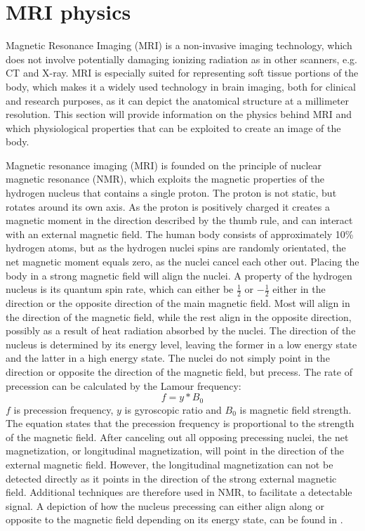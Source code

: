 \section{MRI physics} \label{sec:physics}

Magnetic Resonance Imaging (MRI) is a non-invasive imaging technology, which does not involve potentially damaging ionizing radiation as in other scanners, e.g. CT and X-ray. MRI is especially suited for representing soft tissue portions of the body, which makes it a widely used technology in brain imaging, both for clinical and research purposes, as it can depict the anatomical structure at a millimeter resolution. This section will provide information on the physics behind MRI and which physiological properties that can be exploited to create an image of the body.
 
Magnetic resonance imaging (MRI) is founded on the principle of nuclear magnetic resonance (NMR), which exploits the magnetic properties of the hydrogen nucleus that contains a single proton. The proton is not static, but rotates around its own axis. As the proton is positively charged it creates a magnetic moment in the direction described by the thumb rule, and can interact with an external magnetic field. The human body consists of approximately 10\% hydrogen atoms, but as the hydrogen nuclei spins are randomly orientated, the net magnetic moment equals zero, as the nuclei cancel each other out. Placing the body in a strong magnetic field will align the nuclei. A property of the hydrogen nucleus is its quantum spin rate, which can either be $ \frac{1}{2}$ or $- \frac{1}{2}$ either in the direction or the opposite direction of the main magnetic field. Most will align in the direction of the magnetic field, while the rest align in the opposite direction, possibly as a result of heat radiation absorbed by the nuclei. The direction of the nucleus is determined by its energy level, leaving the former in a low energy state and the latter in a high energy state. The nuclei do not simply point in the direction or opposite the direction of the magnetic field, but precess. \cite{Bharath2008} The rate of precession can be calculated by the Lamour frequency:
\begin{equation} \label{eq:lamour}
f=y*B_0
\end{equation} 
$f$ is precession frequency, $y$ is gyroscopic ratio and $B_0$ is magnetic field strength. The equation states that the precession frequency is proportional to the strength of the magnetic field. After canceling out all opposing precessing nuclei, the net magnetization, or longitudinal magnetization, will point in the direction of the external magnetic field. However, the longitudinal magnetization can not be detected directly as it points in the direction of the strong external magnetic field. Additional techniques are therefore used in NMR, to facilitate a detectable signal. \cite{Bharath2008} A depiction of how the nucleus precessing can either align along or opposite to the magnetic field depending on its energy state, can be found in .  \\

